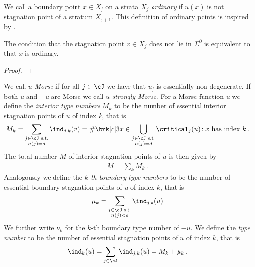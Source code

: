We call a boundary point $x\in X_j$ on a strata $X_j$ \emph{ordinary} if $u(x)$ is not 
stagnation point of a stratum $X_{j+1}$. This definition of ordinary points is inspired by \cite{Morse1970}.
\begin{proposition}
  The condition that the stagnation point $x\in X_j$ does not lie in $\Sigma^0$ is equivalent to that
  $x$ is ordinary.
\end{proposition}
\begin{proof}
\end{proof}

\begin{definition}
  We call $u$ \emph{Morse} if for all $j\in\cJ$ we have that $u_j$ is essentially non-degenerate.
  If both $u$ and $-u$ are Morse we call $u$ \emph{strongly Morse}.
  For a Morse function $u$ we define 
  the \emph{interior type numbers} $M_k$ to be the number of essential interior stagnation points of $u$ of index $k$, that is
  \begin{align}
    M_k=\sum_{\substack{j\in\cJ\text{ s.t.} \\ n(j)=d}}\ind_{j,k}(u)
    =\#\brk[c]3{x\in\bigcup_{\substack{j\in\cJ\text{ s.t.} \\ n(j)=d}}\critical_j(u)\colon x\text{ has index }k}\,.
    \label{eq:def_typenbr_interior}
  \end{align}
  The total number $M$ of interior
  stagnation points of $u$ is then given by
  \begin{align}
    M=\sum_kM_k\,.\label{eq:def_stagnationPtNbr}
  \end{align}
  Analogously we define the \emph{$k$-th boundary type numbers} to be the number of essential boundary 
  stagnation points of $u$ of index $k$, that is
  \begin{align}
    \mu_k=\sum_{\substack{j\in\cJ\text{ s.t.}\\ n(j)<d}}\ind_{j,k}(u)\label{eq:bdTypeNbrs}
  \end{align}
  We further write $\nu_k$ for the $k$-th boundary type number of $-u$.
  We define the \emph{type number} to be the number of
  essential stagnation points of $u$ of index $k$, that is
  \begin{align}
    \ind_k(u)=\sum_{j\in\cJ}\ind_{j,k}(u)=M_k+\mu_k\,.\label{eq:def_typenbr_total}
  \end{align}
\end{definition}

